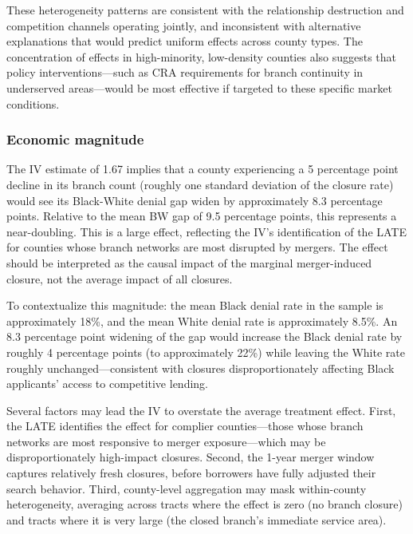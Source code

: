 \documentclass[12pt]{article}
\begin{document}
These heterogeneity patterns are consistent with the relationship destruction and competition channels operating jointly, and inconsistent with alternative explanations that would predict uniform effects across county types. The concentration of effects in high-minority, low-density counties also suggests that policy interventions---such as CRA requirements for branch continuity in underserved areas---would be most effective if targeted to these specific market conditions.

\subsubsection*{Economic magnitude} The IV estimate of 1.67 implies that a county experiencing a 5 percentage point decline in its branch count (roughly one standard deviation of the closure rate) would see its Black-White denial gap widen by approximately 8.3 percentage points. Relative to the mean BW gap of 9.5 percentage points, this represents a near-doubling. This is a large effect, reflecting the IV's identification of the LATE for counties whose branch networks are most disrupted by mergers. The effect should be interpreted as the causal impact of the marginal merger-induced closure, not the average impact of all closures.

To contextualize this magnitude: the mean Black denial rate in the sample is approximately 18\%, and the mean White denial rate is approximately 8.5\%. An 8.3 percentage point widening of the gap would increase the Black denial rate by roughly 4 percentage points (to approximately 22\%) while leaving the White rate roughly unchanged---consistent with closures disproportionately affecting Black applicants' access to competitive lending.

Several factors may lead the IV to overstate the average treatment effect. First, the LATE identifies the effect for complier counties---those whose branch networks are most responsive to merger exposure---which may be disproportionately high-impact closures. Second, the 1-year merger window captures relatively fresh closures, before borrowers have fully adjusted their search behavior. Third, county-level aggregation may mask within-county heterogeneity, averaging across tracts where the effect is zero (no branch closure) and tracts where it is very large (the closed branch's immediate service area).
\end{document}
